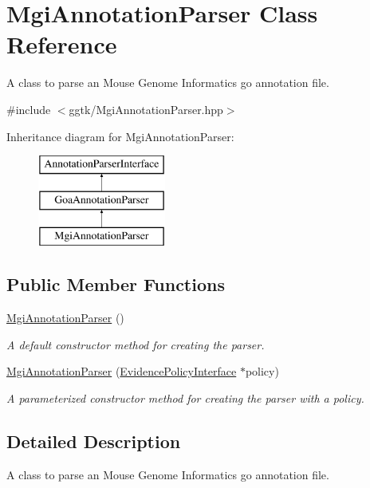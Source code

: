 \hypertarget{classMgiAnnotationParser}{}\section{Mgi\+Annotation\+Parser Class Reference}
\label{classMgiAnnotationParser}


A class to parse an Mouse Genome Informatics go annotation file.  




{\ttfamily \#include $<$ggtk/\+Mgi\+Annotation\+Parser.\+hpp$>$}

Inheritance diagram for Mgi\+Annotation\+Parser\+:\begin{figure}[H]
\begin{center}
\leavevmode
\includegraphics[height=3.000000cm]{classMgiAnnotationParser}
\end{center}
\end{figure}
\subsection*{Public Member Functions}
\begin{DoxyCompactItemize}
\item 
\hyperlink{classMgiAnnotationParser_a2f7a0d1080bf0a338ac35f9cd558da20}{Mgi\+Annotation\+Parser} ()
\begin{DoxyCompactList}\small\item\em A default constructor method for creating the parser. \end{DoxyCompactList}\item 
\hyperlink{classMgiAnnotationParser_ad21111f35a5476970585eb84d7ffbf70}{Mgi\+Annotation\+Parser} (\hyperlink{classEvidencePolicyInterface}{Evidence\+Policy\+Interface} $\ast$policy)
\begin{DoxyCompactList}\small\item\em A parameterized constructor method for creating the parser with a policy. \end{DoxyCompactList}\end{DoxyCompactItemize}


\subsection{Detailed Description}
A class to parse an Mouse Genome Informatics go annotation file. 

